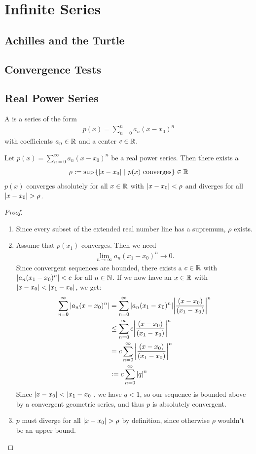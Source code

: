 \chapter{Infinite Series}
\section{Achilles and the Turtle}
\section{Convergence Tests}
\section{Real Power Series}
\begin{definition}
	A  is a series of the form
	\begin{align*}
		p(x) = \sum_{n = 0}^n a_n (x - x_0)^n
	\end{align*}
	with coefficients $a_n \in \mathbb{R}$ and a center $c \in \mathbb{R}$.
\end{definition}
\begin{theorem}
	\label{th:realconvergenceradius}
	Let $p(x) = \sum_{n = 0}^\infty a_n (x - x_0)^n$ be a real power series. Then there exists a 
	\begin{align*}
		\rho := \sup\qty{\abs{x - x_0} ~\middle|~p(x) \textnormal{ converges}} \in \bar {\mathbb{R}}
	\end{align*}
	$p(x)$ converges absolutely for all $x \in \mathbb{R}$ with $\abs{x - x_0} < \rho$ and diverges for all $\abs{x - x_0} > \rho$.
\end{theorem}
\begin{proof}
	\begin{enumerate}
		\item Since every subset of the extended real number line has a supremum, $\rho$ exists.
		\item Assume that $p(x_1)$ converges. Then we need
		\begin{align*}
			\lim_{n \to \infty} a_n (x_1-x_0)^n \to 0.
		\end{align*}
		Since convergent sequences are bounded, there exists a $c \in \mathbb{R}$ with $\abs{a_n (x_1 - x_0)^n} < c$ for all $n \in \mathbb{N}$. If we now have an $x \in \mathbb{R}$ with $\abs{x - x_0} < \abs{x_1 - x_0}$, we get:
		\begin{align*}
			\sum_{n = 0}^\infty \abs{a_n (x - x_0)^n} 
			&= \sum_{n = 0}^\infty \abs{a_n (x_1 - x_0)^n} \abs{\frac{(x - x_0)}{(x_1 - x_0)}}^n\\
			&\leq \sum_{n = 0}^\infty c \abs{\frac{(x - x_0)}{(x_1 - x_0)}}^n\\
			&= c \sum_{n = 0}^\infty \abs{\frac{(x - x_0)}{(x_1 - x_0)}}^n\\
			&:= c \sum_{n = 0}^\infty \abs{q}^n
		\end{align*}
		Since $\abs{x - x_0} < \abs{x_1 - x_0}$, we have $q < 1$, so our sequence is bounded above by a convergent geometric series, and thus $p$ is absolutely convergent.
		\item $p$ must diverge for all $\abs{x - x_0} > \rho$ by definition, since otherwise $\rho$ wouldn't be an upper bound.
	\end{enumerate}
\end{proof}
